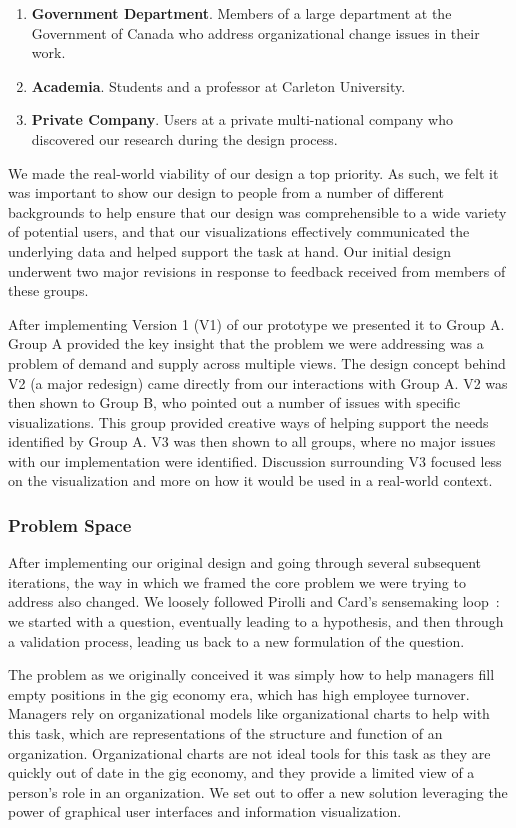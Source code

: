 \documentclass[journal]{vgtc}                %
\begin{document}
\begin{enumerate}[label=(\Alph*)]
\item  \textbf{Government Department}. Members of a large department at the Government of Canada who address organizational change issues in their work.
\item \textbf{Academia}. Students and a professor at Carleton University.
\item \textbf{Private Company}. Users at a private multi-national company who discovered our research during the design process.
\end{enumerate}

We made the real-world viability of our design a top priority. As such, we felt it was important to show our design to people from a number of different backgrounds to help ensure that our design was comprehensible to a wide variety of potential users, and that our visualizations effectively communicated the underlying data and helped support the task at hand. Our initial design underwent two major revisions in response to feedback received from members of these groups. 

After implementing Version 1 (V1) of our prototype we presented it to Group A. Group A provided the key insight that the problem we were addressing was a problem of demand and supply across multiple views. The design concept behind V2 (a major redesign) came directly from our interactions with Group A. V2 was then shown to Group B, who pointed out a number of issues with specific visualizations.  This group provided creative ways of helping support the needs identified by Group A. V3 was then shown to all groups, where no major issues with our implementation were identified. Discussion surrounding V3 focused less on the visualization and more on how it would be used in a real-world context.

\subsubsection{Problem Space}
\label{sec:problem}
After implementing our original design and going through several subsequent iterations, the way in which we framed the core problem we were trying to address also changed. We loosely followed Pirolli and Card's sensemaking loop~\cite{pirolli2005sensemaking}: we started with a question, eventually leading to a hypothesis, and then through a validation process, leading us back to a new formulation of the question.  

The problem as we originally conceived it was simply how to help managers fill empty positions in the gig economy era, which has high employee turnover. Managers rely on organizational models like organizational charts to help with this task, which are representations of the structure and function of an organization. Organizational charts are not ideal tools for this task as they are quickly out of date in the gig economy, and they provide a limited view of a person's role in an organization. We set out to offer a new solution leveraging the power of graphical user interfaces and information visualization. 
\end{document}
